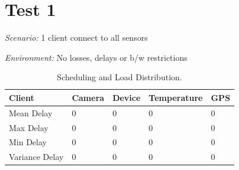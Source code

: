 \chapter{Test 1}

\hspace*{4.3mm} \textit{Scenario:} 1 client connect to all sensors

\textit{Environment:} No losses, delays or b/w restrictions

\begin{center}
\begin{table}[h]\footnotesize
  \begin{tabular}{| p{3cm}  | p{1.5cm} | p{1.5cm} | p{2cm} |p{1cm} |}
   \hline
  \textbf{Client}  & \textbf{Camera} & \textbf{Device} & \textbf{Temperature} & \textbf{GPS}\\ \hline
   Mean Delay & 0 & 0 &  0 &  0 \\ \hline
   Max Delay & 0 &0  & 0  & 0  \\ \hline
   Min Delay  & 0 &  0& 0  & 0  \\ \hline
   Variance Delay  & 0 & 0 & 0  & 0  \\ \hline
  \end{tabular}
   \caption{Scheduling and Load Distribution.}
    \label{comparison}  
  \end{table}
\end{center}
